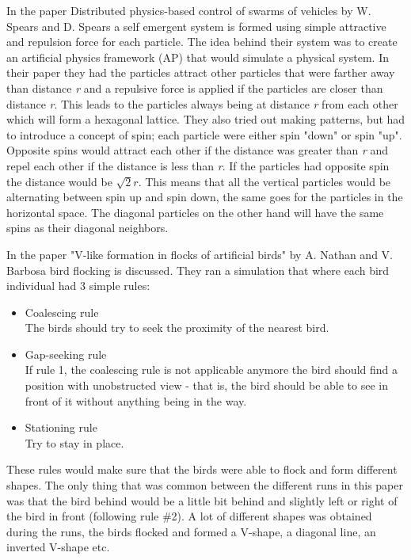 In the paper Distributed physics-based control of swarms of vehicles by W. Spears and D. Spears a self emergent system is formed using simple attractive and repulsion force for each particle. The idea behind their system was to create an artificial physics framework (AP) that would simulate a physical system. In their paper they had the particles attract other particles that were farther away than distance \textit{r} and a repulsive force is applied if the particles are closer than distance \textit{r}. This leads to the particles always being at distance \textit{r} from each other which will form a hexagonal lattice. They also tried out making patterns, but had to introduce a concept of spin; each particle were either spin "down" or spin "up". Opposite spins would attract each other if the distance was greater than \textit{r} and repel each other if the distance is less than \textit{r}. If the particles had opposite spin the distance would be $\sqrt{2}r$. This means that all the vertical particles would be alternating between spin up and spin down, the same goes for the particles in the horizontal space. The diagonal particles on the other hand will have the same spins as their diagonal neighbors.

In the paper "V-like formation in flocks of artificial birds" by A. Nathan and V. Barbosa bird flocking is discussed. They ran a simulation that where each bird individual had 3 simple rules: 
\begin{itemize}
    \item Coalescing rule \\
        The birds should try to seek the proximity of the nearest bird.
    \item Gap-seeking rule \\
        If rule 1, the coalescing rule is not applicable anymore the bird should find a position with unobstructed view -  that is, the bird should be able to see in front of it without anything being in the way.
    \item Stationing rule \\
        Try to stay in place.
\end{itemize}
These rules would make sure that the birds were able to flock and form different shapes. The only thing that was common between the different runs in this paper was that the bird behind would be a little bit behind and slightly left or right of the bird in front (following rule \#2). A lot of different shapes was obtained during the runs, the birds flocked and formed a V-shape, a diagonal line, an inverted V-shape etc.


